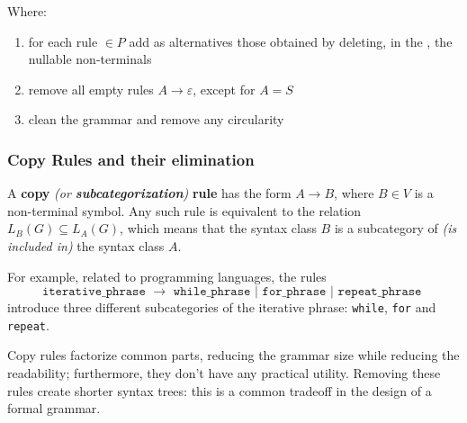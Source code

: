 \documentclass[english]{article}
\begin{document}
Where:

\begin{enumerate}[label=row \arabic*., leftmargin=*, widest*=6, labelindent=1em]
  \item for each rule \(\in P\) add as alternatives those obtained by deleting, in the \RP, the nullable non-terminals
  \item remove all empty rules \(A \rightarrow \varepsilon\), except for \(A=S\)
  \item clean the grammar and remove any circularity
\end{enumerate}

\subsubsection{Copy Rules and their elimination}
\label{sec:copy-rules-and-their-elimination}

A \textbf{copy}\textit{ (or \textbf{subcategorization})} \textbf{rule} has the form \(A \rightarrow B\), where \(B \in V\) is a non-terminal symbol.
Any such rule is equivalent to the relation \(L_B(G) \subseteq L_A(G)\), which means that the syntax class \(B\) is a subcategory of \textit{(is included in)} the syntax class \(A\).

For example, related to programming languages, the rules
\[\texttt{iterative\_phrase } \rightarrow \texttt{ while\_phrase } | \texttt{ for\_phrase } | \texttt{ repeat\_phrase }\]
introduce three different subcategories of the iterative phrase: \texttt{while}, \texttt{for} and \texttt{repeat}.

Copy rules factorize common parts, reducing the grammar size while reducing the readability;
furthermore, they don't have any practical utility.
Removing these rules create shorter syntax trees: this is a common tradeoff in the design of a formal grammar.
\end{document}
